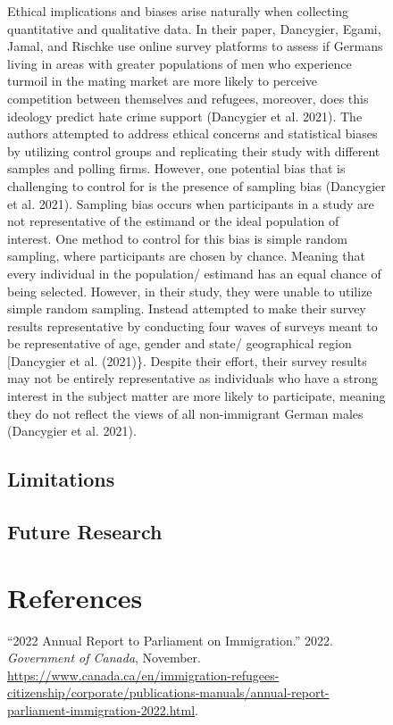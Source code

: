 \documentclass[
]{article}
\newlength{\cslhangindent}
\newlength{\cslentryspacingunit} %
\newenvironment{CSLReferences}[2] %
 {%
  \setlength{\parindent}{0pt}
  \ifodd #1
  \let\oldpar\par
  \def\par{\hangindent=\cslhangindent\oldpar}
  \fi
  \setlength{\parskip}{#2\cslentryspacingunit}
 }%
 {}
\begin{document}
\begin{figure}
Ethical implications and biases arise naturally when collecting
quantitative and qualitative data. In their paper, Dancygier, Egami,
Jamal, and Rischke use online survey platforms to assess if Germans
living in areas with greater populations of men who experience turmoil
in the mating market are more likely to perceive competition between
themselves and refugees, moreover, does this ideology predict hate crime
support (Dancygier et al. 2021). The authors attempted to address
ethical concerns and statistical biases by utilizing control groups and
replicating their study with different samples and polling firms.
However, one potential bias that is challenging to control for is the
presence of sampling bias (Dancygier et al. 2021). Sampling bias occurs
when participants in a study are not representative of the estimand or
the ideal population of interest. One method to control for this bias is
simple random sampling, where participants are chosen by chance. Meaning
that every individual in the population/ estimand has an equal chance of
being selected. However, in their study, they were unable to utilize
simple random sampling. Instead attempted to make their survey results
representative by conducting four waves of surveys meant to be
representative of age, gender and state/ geographical region
{[}Dancygier et al. (2021)\}. Despite their effort, their survey results
may not be entirely representative as individuals who have a strong
interest in the subject matter are more likely to participate, meaning
they do not reflect the views of all non-immigrant German males
(Dancygier et al. 2021).

\hypertarget{limitations}{%
\subsection{Limitations}\label{limitations}}

\hypertarget{future-research}{%
\subsection{Future Research}\label{future-research}}

\clearpage

\hypertarget{references}{%
\section*{References}\label{references}}

\hypertarget{refs}{}
\begin{CSLReferences}{1}{0}
\leavevmode{}%
{``2022 Annual Report to Parliament on Immigration.''} 2022.
\emph{Government of Canada}, November.
\url{https://www.canada.ca/en/immigration-refugees-citizenship/corporate/publications-manuals/annual-report-parliament-immigration-2022.html}.


\end{CSLReferences}
\end{figure}
\end{document}
